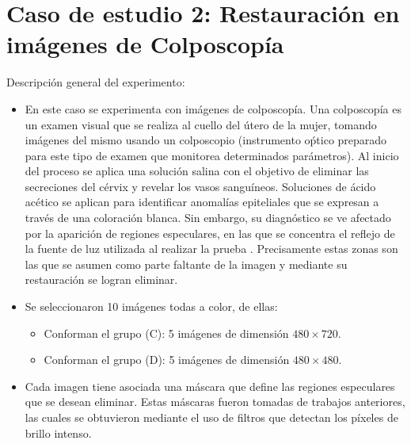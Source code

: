 \section{Caso de estudio 2: Restauraci\'on en im\'agenes de Colposcop\'ia}
Descripci\'on general del experimento:
\begin{itemize}
	\item En este caso se experimenta con im\'agenes de colposcop\'ia. Una colposcop\'ia es un examen visual que se realiza al cuello del \'utero de la mujer, tomando im\'agenes del mismo usando un colposcopio (instrumento o\'ptico preparado para este tipo de examen que monitorea determinados par\'ametros). Al inicio del proceso se aplica una solución salina con el objetivo de eliminar las secreciones del cérvix y revelar los vasos sanguíneos. Soluciones de ácido acético se aplican para identificar anomalías epiteliales que se expresan a través de una coloración blanca. Sin embargo, su diagnóstico se ve afectado por la aparición de regiones especulares, en las que se concentra el reflejo de la fuente de luz utilizada al realizar la prueba \cite{dgomez2018tesis}. Precisamente estas zonas son las que se asumen como parte faltante de la imagen y mediante su restauraci\'on se logran eliminar.
	
	\item Se seleccionaron 10 im\'agenes todas a color, de ellas:
	\begin{itemize}
		\item Conforman el grupo (C): 5 im\'agenes de dimensi\'on $480 \times 720$.
		\item Conforman el grupo (D): 5 im\'agenes de dimensi\'on $480 \times 480$.
	\end{itemize}
	
	\item Cada imagen tiene asociada una m\'ascara que define las regiones especulares que se desean eliminar. Estas m\'ascaras fueron tomadas de trabajos anteriores, las cuales se obtuvieron mediante el uso de filtros que detectan los p\'ixeles de brillo intenso.
	

\end{itemize}
